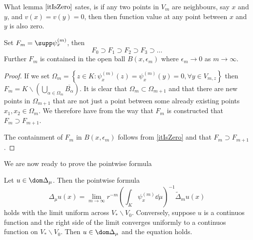 What lemma $\ref{itIsZero}$ sates, is if any two points in $V_m$ are neighbours, say $x$ and $y$, and $v(x)=v(y)=0$, then then function value at any point between $x$ and $y$ is also zero.

\begin{lemma}\label{FmSmaller}
	Set $F_m = \supp \psi_{x}^{(m)}$, then
	\begin{equation}
		F_0 \supset F_1 \supset F_2 \supset F_3 \supset \dots
	\end{equation}
	Further $F_m$ is contained in the open ball $B(x, \epsilon_m)$ where $\epsilon_m \to 0$ as $m \to \infty$.
\end{lemma}

\begin{proof}
	If we set $\Omega_m = \left\{z \in K : \psi_{x}^{(m)}(z) = \psi_{x}^{(m)}(y) = 0, \forall y \in V_{m,z}  \right\}$ then $F_m = K \backslash \left(\bigcup_{\alpha \in \Omega_m} \overline{B_\alpha} \right)$. It is clear that $\Omega_m \subset \Omega_{m+1}$ and that there are new points in $\Omega_{m+1}$ that are not just a point between some already existing points $x_1, x_2 \in \Omega_m$. We therefore have from the way that $F_m$ is constructed that $F_m \supset F_{m+1}$.
	
	The containment of $F_m$ in $B(x, \epsilon_m)$ follows from \cref{itIsZero} and that $F_m \supset F_{m+1}$.
\end{proof}

We are now ready to prove the pointwise formula

\begin{theorem} \label{pointwiseFormula}
	Let $u \in \dom \Delta_{\mu}$. Then the pointwise formula
	\begin{equation}
		\Delta_{\mu} u(x) = \lim_{m \to \infty} r^{-m} \left(\int_{K} \psi_x^{(m)} \dd \mu \right)^{-1} \widetilde{\Delta}_m u(x)
	\end{equation}
	holds with the limit uniform across $V_* \backslash V_0$. Conversely, suppose $u$ is a continuos function and the right side of the limit converges uniformly to a continuos function on $V_* \backslash V_0$. Then $u \in \dom \Delta_{\mu}$ and the equation holds.
\end{theorem}

